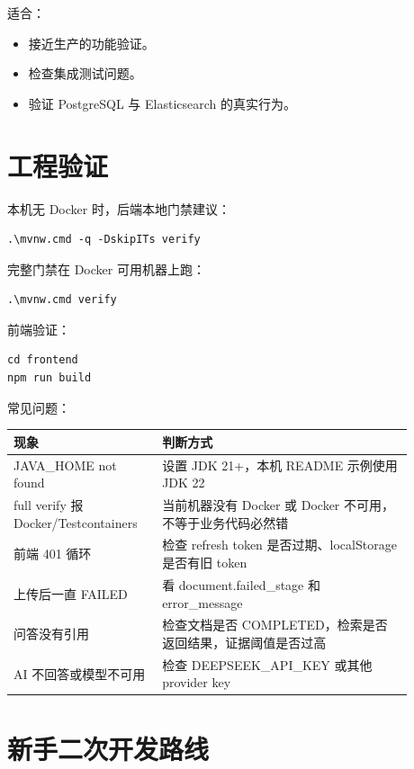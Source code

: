 \documentclass[UTF8,zihao=-4]{ctexart}
\begin{document}
适合：

\begin{itemize}
  \item 接近生产的功能验证。
  \item 检查集成测试问题。
  \item 验证 PostgreSQL 与 Elasticsearch 的真实行为。
\end{itemize}

\section{工程验证}

本机无 Docker 时，后端本地门禁建议：

\begin{lstlisting}[style=code]
.\mvnw.cmd -q -DskipITs verify
\end{lstlisting}

完整门禁在 Docker 可用机器上跑：

\begin{lstlisting}[style=code]
.\mvnw.cmd verify
\end{lstlisting}

前端验证：

\begin{lstlisting}[style=code]
cd frontend
npm run build
\end{lstlisting}

常见问题：

\begin{longtable}{L{0.30\linewidth}L{0.58\linewidth}}
\toprule
现象 & 判断方式 \\
\midrule
JAVA\_HOME not found & 设置 JDK 21+，本机 README 示例使用 JDK 22 \\
full verify 报 Docker/Testcontainers & 当前机器没有 Docker 或 Docker 不可用，不等于业务代码必然错 \\
前端 401 循环 & 检查 refresh token 是否过期、localStorage 是否有旧 token \\
上传后一直 FAILED & 看 document.failed\_stage 和 error\_message \\
问答没有引用 & 检查文档是否 COMPLETED，检索是否返回结果，证据阈值是否过高 \\
AI 不回答或模型不可用 & 检查 DEEPSEEK\_API\_KEY 或其他 provider key \\
\bottomrule
\end{longtable}

\section{新手二次开发路线}
\end{document}
